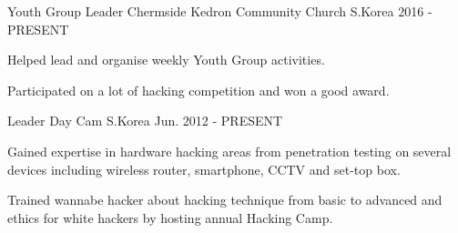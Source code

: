 


\begin{cventries}


\cventry
{Youth Group Leader} %
{Chermside Kedron Community Church} %
{S.Korea} %
{2016 - PRESENT} %
{ %
\begin{cvitems}
\item {Helped lead and organise weekly Youth Group activities.}
\item {Participated on a lot of hacking competition and won a good award.}
\end{cvitems}
}


\cventry
{Leader} %
{Day Cam} %
{S.Korea} %
{Jun. 2012 - PRESENT} %
{ %
\begin{cvitems}
\item {Gained expertise in hardware hacking areas from penetration testing on several devices including wireless router, smartphone, CCTV and set-top box.}
\item {Trained wannabe hacker about hacking technique from basic to advanced and ethics for white hackers by hosting annual Hacking Camp.}
\end{cvitems}
}

\end{cventries}